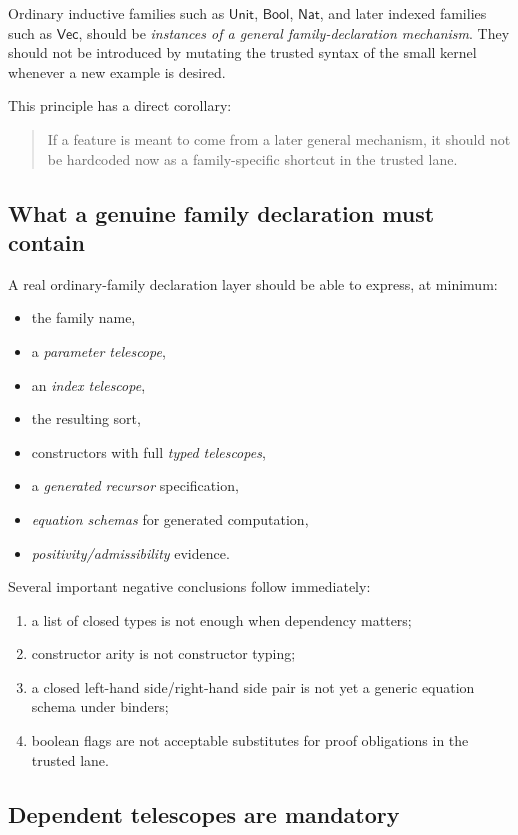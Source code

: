 \documentclass[11pt]{article}
\newcommand{\Nat}{\ensuremath{\mathsf{Nat}}}
\newcommand{\Bool}{\ensuremath{\mathsf{Bool}}}
\newcommand{\UnitTy}{\ensuremath{\mathsf{Unit}}}
\newcommand{\VecTy}{\ensuremath{\mathsf{Vec}}}
\begin{document}
Ordinary inductive families such as \UnitTy{}, \Bool{}, \Nat{}, and later
indexed families such as $\VecTy$, should be \emph{instances of a general
family-declaration mechanism}. They should not be introduced by mutating the
trusted syntax of the small kernel whenever a new example is desired.

This principle has a direct corollary:

\begin{quote}
If a feature is meant to come from a later general mechanism, it should not be
hardcoded now as a family-specific shortcut in the trusted lane.
\end{quote}

\subsection{What a genuine family declaration must contain}

A real ordinary-family declaration layer should be able to express, at minimum:
\begin{itemize}[leftmargin=2em]
  \item the family name,
  \item a \emph{parameter telescope},
  \item an \emph{index telescope},
  \item the resulting sort,
  \item constructors with full \emph{typed telescopes},
  \item a \emph{generated recursor} specification,
  \item \emph{equation schemas} for generated computation,
  \item \emph{positivity/admissibility} evidence.
\end{itemize}

Several important negative conclusions follow immediately:
\begin{enumerate}[leftmargin=2em]
  \item a list of closed types is not enough when dependency matters;
  \item constructor arity is not constructor typing;
  \item a closed left-hand side/right-hand side pair is not yet a generic
  equation schema under binders;
  \item boolean flags are not acceptable substitutes for proof obligations in
  the trusted lane.
\end{enumerate}

\subsection{Dependent telescopes are mandatory}
\end{document}

